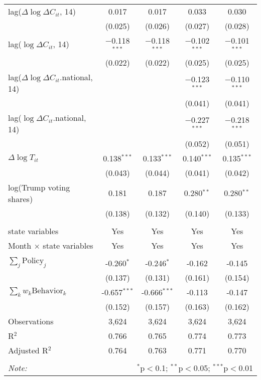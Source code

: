\begin{tabular}{@{\extracolsep{1pt}}lcccc}
  lag($\Delta \log \Delta C_{it}$, 14) & 0.017 & 0.017 & 0.033 & 0.030 \\ 
  & (0.025) & (0.026) & (0.027) & (0.028) \\ 
  lag($\log \Delta C_{it}$, 14) & $-$0.118$^{***}$ & $-$0.118$^{***}$ & $-$0.102$^{***}$ & $-$0.101$^{***}$ \\ 
  & (0.022) & (0.022) & (0.025) & (0.025) \\ 
  lag($\Delta \log \Delta C_{it}$.national, 14) &  &  & $-$0.123$^{***}$ & $-$0.110$^{***}$ \\ 
  &  &  & (0.041) & (0.041) \\ 
  lag($\log \Delta C_{it}$.national, 14) &  &  & $-$0.227$^{***}$ & $-$0.218$^{***}$ \\ 
  &  &  & (0.052) & (0.051) \\ 
  $\Delta \log T_{it}$ & 0.138$^{***}$ & 0.133$^{***}$ & 0.140$^{***}$ & 0.135$^{***}$ \\ 
  & (0.043) & (0.044) & (0.041) & (0.042) \\ 
  log(Trump voting shares) & 0.181 & 0.187 & 0.280$^{**}$ & 0.280$^{**}$ \\ 
  & (0.138) & (0.132) & (0.140) & (0.133) \\ 
 \hline \\[-1.8ex] 
state variables & Yes & Yes & Yes & Yes \\ 
Month $\times$ state variables & Yes & Yes & Yes & Yes \\ 
\hline \\[-1.8ex] 
$\sum_j \mathrm{Policy}_j$ & -0.260$^{*}$ & -0.246$^{*}$ & -0.162 & -0.145 \\ 
 & (0.137) & (0.131) & (0.161) & (0.154) \\ 
$\sum_k w_k \mathrm{Behavior}_k$ & -0.657$^{***}$ & -0.666$^{***}$ & -0.113 & -0.147 \\ 
 & (0.152) & (0.157) & (0.163) & (0.162) \\ 
Observations & 3,624 & 3,624 & 3,624 & 3,624 \\ 
R$^{2}$ & 0.766 & 0.765 & 0.774 & 0.773 \\ 
Adjusted R$^{2}$ & 0.764 & 0.763 & 0.771 & 0.770 \\ 
\hline 
\hline \\[-1.8ex] 
\textit{Note:}  & \multicolumn{4}{r}{$^{*}$p$<$0.1; $^{**}$p$<$0.05; $^{***}$p$<$0.01} \\ 
\end{tabular} 